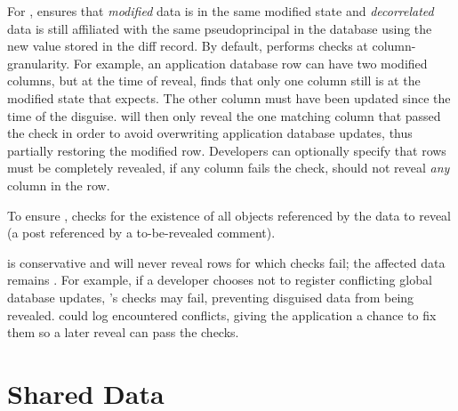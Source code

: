 %
For \two{}, \sys ensures that \emph{modified} \xxed data is in the same modified
state and \emph{decorrelated} \xxed data is still affiliated with the same
pseudoprincipal in the database using the new value stored in the diff record.
%
By default, \sys performs checks at column-granularity. For example, an application
database row can have two modified columns, but at the time of reveal, \sys
finds that only one column still is at the modified state that \sys expects. The
other column must have been updated since the time of the disguise.  \sys will
then only reveal the one matching column that passed the check in order to avoid
overwriting application database updates, thus partially restoring the modified row.
Developers can optionally specify that rows must be completely revealed, \ie if
any column fails the check, \sys should not reveal \emph{any} column in the row.
%

%
To ensure \three{}, \sys checks for the existence of all objects referenced by
the data to reveal (\eg a post referenced by a to-be-revealed comment).

\sys is conservative and will never reveal rows for which checks fail; the
affected data remains \xxed.  For example, if a developer chooses not to
register conflicting global database updates, \sys's checks may
fail, preventing disguised data from being revealed.
%
\sys could log encountered conflicts, giving the application a chance to fix
them so a later reveal can pass the checks.


\section{Shared Data}
\label{s:shared}


